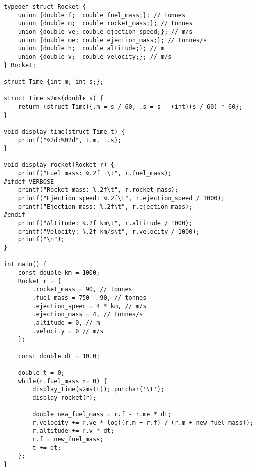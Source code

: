 \documentclass[french,a4paper,addpoints,11pt]{exam}
\begin{document}
\begin{questions}
\begin{solution}
\begin{lstlisting}
typedef struct Rocket {
    union {double f;  double fuel_mass;}; // tonnes
    union {double m;  double rocket_mass;}; // tonnes
    union {double ve; double ejection_speed;}; // m/s
    union {double me; double ejection_mass;}; // tonnes/s
    union {double h;  double altitude;}; // m
    union {double v;  double velocity;}; // m/s
} Rocket;

struct Time {int m; int s;};

struct Time s2ms(double s) {
    return (struct Time){.m = s / 60, .s = s - (int)(s / 60) * 60};
}

void display_time(struct Time t) {
    printf("%2d:%02d", t.m, t.s);
}

void display_rocket(Rocket r) {
    printf("Fuel mass: %.2f t\t", r.fuel_mass);
#ifdef VERBOSE
    printf("Rocket mass: %.2f\t", r.rocket_mass);
    printf("Ejection speed: %.2f\t", r.ejection_speed / 1000);
    printf("Ejection mass: %.2f\t", r.ejection_mass);
#endif
    printf("Altitude: %.2f km\t", r.altitude / 1000);
    printf("Velocity: %.2f km/s\t", r.velocity / 1000);
    printf("\n");
}

int main() {
    const double km = 1000;
    Rocket r = {
        .rocket_mass = 90, // tonnes
        .fuel_mass = 750 - 90, // tonnes
        .ejection_speed = 4 * km, // m/s
        .ejection_mass = 4, // tonnes/s
        .altitude = 0, // m
        .velocity = 0 // m/s
    };

    const double dt = 10.0;

    double t = 0;
    while(r.fuel_mass >= 0) {
        display_time(s2ms(t)); putchar('\t');
        display_rocket(r);

        double new_fuel_mass = r.f - r.me * dt;
        r.velocity += r.ve * log((r.m + r.f) / (r.m + new_fuel_mass));
        r.altitude += r.v * dt;
        r.f = new_fuel_mass;
        t += dt;
    };
}
    \end{lstlisting}
    \end{solution}
    \end{questions}
\end{document}
